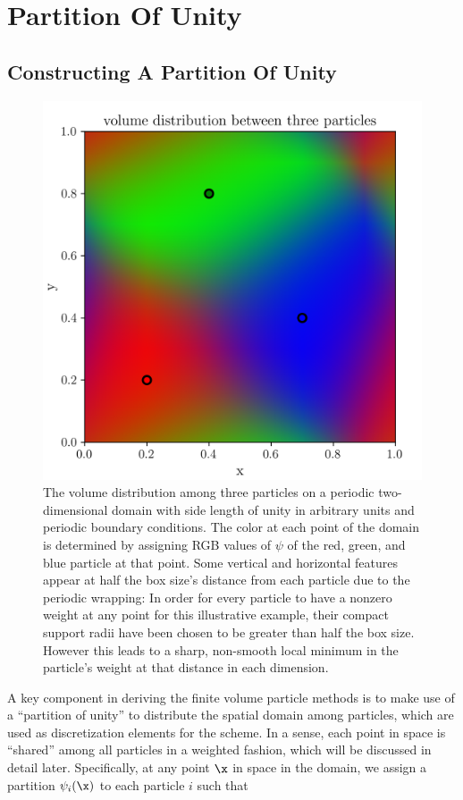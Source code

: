 \chapter{Partition Of Unity}


\section{Constructing A Partition Of Unity}


\begin{figure}
 \centering
 \includegraphics[width=.7\textwidth]{figures/Meshless/volume_distribution_three_particles.png}%
 \caption{
The volume distribution among three particles on a periodic two-dimensional domain with side
length of unity in arbitrary units and periodic boundary conditions. The color at each point of the
domain is determined by assigning RGB values of $\psi$ of the red, green, and blue particle at that
point. Some vertical and horizontal features appear at half the box size's distance from each
particle due to the periodic wrapping: In order for every particle to have a nonzero weight at any
point for this illustrative example, their compact support radii have been chosen to be greater
than half the box size. However this leads to a sharp, non-smooth local minimum in the particle's
weight at that distance in each dimension.
}
\label{fig:psi-volume-distribution}
\end{figure}


A key component in deriving the finite volume particle methods is to make use of a ``partition of
unity'' to distribute the spatial domain among particles, which are used as discretization
elements for the scheme. In a sense, each point in space is ``shared'' among all particles in a
weighted fashion, which will be discussed in detail later. Specifically, at any point $\x$ in space
in the domain, we assign a partition $\psi_i(\x)$ to each particle $i$ such that

